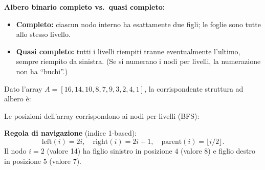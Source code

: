 \begin{nota}
	\textbf{Albero binario completo vs.\ quasi completo:}
	\begin{itemize}
		\item \textbf{Completo:} ciascun nodo interno ha esattamente due
		figli; le foglie sono tutte allo stesso livello.
		\item \textbf{Quasi completo:} tutti i livelli riempiti tranne
		eventualmente l'ultimo, sempre riempito da sinistra.
		(Se si numerano i nodi per livelli, la numerazione non ha
		``buchi''.)
	\end{itemize}
\end{nota}

\begin{esempio}
	Dato l'array $A = [16, 14, 10, 8, 7, 9, 3, 2, 4, 1]$, la corrispondente
	struttura ad albero è:
	
	\begin{center}
	\end{center}
	
	\noindent Le posizioni dell'array corrispondono ai nodi per livelli
	(BFS):
	
	\begin{center}
	\end{center}
	
	\noindent \textbf{Regola di navigazione} (indice 1-based):
	\[
	\mathrm{left}(i) = 2i, \quad
	\mathrm{right}(i) = 2i+1, \quad
	\mathrm{parent}(i) = \lfloor i/2 \rfloor.
	\]
	Il nodo $i=2$ (valore 14) ha figlio sinistro in posizione $4$ (valore 8)
	e figlio destro in posizione $5$ (valore 7).
\end{esempio}

